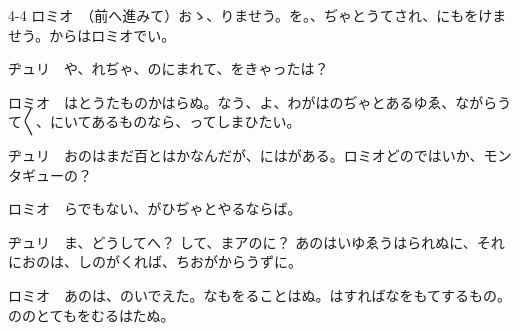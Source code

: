 \documentclass[tate,paper=b6j,jafontsize=9pt]{jlreq}
\begin{document}
\begin{azconvIndented}{4\zw}{-4\zw}
ロミオ　（前へ進みて）おゝ、りませう。を。、ぢゃとうてされ、にもをけませう。からはロミオでい。

ヂュリ　や、れぢゃ、のにまれて、をきゃったは？

ロミオ　はとうたものかはらぬ。なう、よ、わがはのぢゃとあるゆゑ、ながらうて{〳〵}、にいてあるものなら、ってしまひたい。

ヂュリ　おのはまだ百とはかなんだが、にはがある。ロミオどのではいか、モンタギューの？

ロミオ　らでもない、がひぢゃとやるならば。

ヂュリ　ま、どうしてへ？ して、まアのに？ あのはいゆゑうはられぬに、それにおのは、しのがくれば、ちおがからうずに。

ロミオ　あのは、のいでえた。なもをることはぬ。はすればなをもてするもの。ののとてもをむるはたぬ。


\end{azconvIndented}
\end{document}
